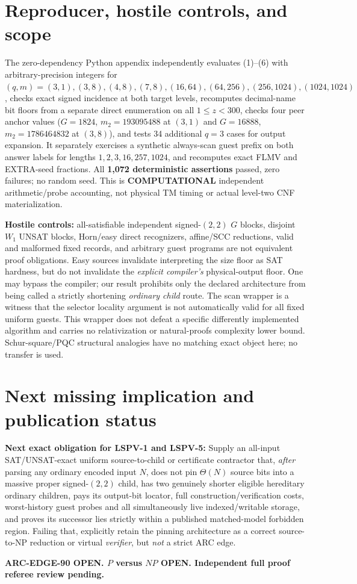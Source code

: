 \documentclass[11pt]{article}
\begin{document}
\section{Reproducer, hostile controls, and scope}
The zero-dependency Python appendix independently evaluates (1)--(6) with arbitrary-precision integers for $(q,m)=(3,1),(3,8),(4,8),(7,8),(16,64),(64,256),(256,1024),(1024,1024)$, checks exact signed incidence at both target levels, recomputes decimal-name bit floors from a separate direct enumeration on all $1\le z<300$, checks four peer anchor values ($G=1824$, $m_2=193095488$ at $(3,1)$ and $G=16888$, $m_2=1786464832$ at $(3,8)$), and tests 34 additional $q=3$ cases for output expansion. It separately exercises a synthetic always-scan guest prefix on both answer labels for lengths $1,2,3,16,257,1024$, and recomputes exact FLMV and EXTRA-seed fractions. All \textbf{1,072 deterministic assertions} passed, zero failures; no random seed. This is \textbf{COMPUTATIONAL} independent arithmetic/probe accounting, not physical TM timing or actual level-two CNF materialization.

\textbf{Hostile controls:} all-satisfiable independent signed-$(2,2)$ $G$ blocks, disjoint $W_1$ UNSAT blocks, Horn/easy direct recognizers, affine/SCC reductions, valid and malformed fixed records, and arbitrary guest programs are not equivalent proof obligations. Easy sources invalidate interpreting the size floor as SAT hardness, but do not invalidate the \emph{explicit compiler's} physical-output floor. One may bypass the compiler; our result prohibits only the declared architecture from being called a strictly shortening \emph{ordinary child} route. The scan wrapper is a witness that the selector locality argument is not automatically valid for all fixed uniform guests. This wrapper does not defeat a specific differently implemented algorithm and carries no relativization or natural-proofs complexity lower bound. Schur-square/PQC structural analogies have no matching exact object here; no transfer is used.

\section{Next missing implication and publication status}
\textbf{Next exact obligation for LSPV-1 and LSPV-5:} Supply an all-input SAT/UNSAT-exact uniform source-to-child or certificate contractor that, \emph{after} parsing any ordinary encoded input $N$, does not pin $\Theta(N)$ source bits into a massive proper signed-$(2,2)$ child, has two genuinely shorter eligible hereditary ordinary children, pays its output-bit locator, full construction/verification costs, worst-history guest probes and all simultaneously live indexed/writable storage, and proves its successor lies strictly within a published matched-model forbidden region. Failing that, explicitly retain the pinning architecture as a correct source-to-NP reduction or virtual \emph{verifier}, but \emph{not} a strict ARC edge.

\noindent\textbf{ARC-EDGE-90 OPEN. $P$ versus $NP$ OPEN. Independent full proof referee review pending.}



\end{document}
